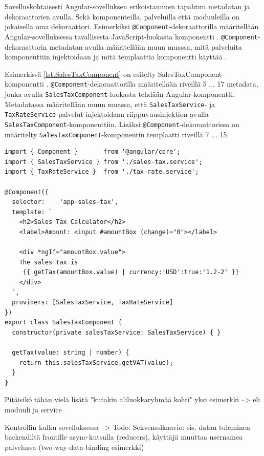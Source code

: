 \documentclass[finnish]{tktltiki2}
\theoremstyle{definition}
\theoremstyle{remark}
\numberwithin{figure}{section}
\begin{document}
Sovelluskohtaisesti Angular-sovelluksen erikoistaminen tapahtuu metadatan ja dekoraattorien avulla. Sekä komponenteilla, palveluilla että moduuleilla on jokaisella oma dekoraattori. Esimerkiksi \texttt{@Component}-dekoraattorilla määritellään Angular-sovelluksessa tavallisesta JavaScript-luokasta komponentti \cite{ArchitectureComponents}. \texttt{@Component}-dekoraattorin metadatan avulla määritellään muun muassa, mitä palveluita komponenttiin injektoidaan ja mitä templaattia komponentti käyttää \cite{ArchitectureComponents}. 

Esimerkissä \ref{lst:SalesTaxComponent} on esitelty SalesTaxComponent-komponentti \cite{ExampleApplication}. \texttt{@Component}-dekoraattorilla määritellään riveillä 5 ... 17 metadata, jonka avulla \texttt{SalesTaxComponent}-luokasta tehdään Angular-komponentti. Metadatassa määritellään muun muassa, että \texttt{SalesTaxService}- ja \texttt{TaxRateService}-palvelut injektoidaan riippuvuusinjektion avulla \texttt{SalesTaxComponent}-komponenttiin. Lisäksi \texttt{@Component}-dekoraattorissa on määritelty \texttt{SalesTaxComponent}-komponentin templaatti riveillä 7 ... 15. 

\begin{lstlisting}[style=htmlcssjs, caption=SalesTaxComponent-komponentti \protect\cite{ExampleApplication}, label=lst:SalesTaxComponent ]
import { Component }       from '@angular/core';
import { SalesTaxService } from './sales-tax.service';
import { TaxRateService }  from './tax-rate.service';

@Component({
  selector:    'app-sales-tax',
  template: `
    <h2>Sales Tax Calculator</h2>
    <label>Amount: <input #amountBox (change)="0"></label>

    <div *ngIf="amountBox.value">
    The sales tax is
     {{ getTax(amountBox.value) | currency:'USD':true:'1.2-2' }}
    </div>
  `,
  providers: [SalesTaxService, TaxRateService]
})
export class SalesTaxComponent {
  constructor(private salesTaxService: SalesTaxService) { }

  getTax(value: string | number) {
    return this.salesTaxService.getVAT(value);
  }
}
\end{lstlisting}

Pitäisikö tähän vielä lisätä "kutakin aliluokkaryhmää kohti" yksi esimerkki --> eli moduuli ja service

Kontrollin kulku sovelluksessa --> Todo: Sekvenssikaavio: sis. datan tuleminen backendiltä frontille async-kutsulla (reducers), käyttäjä muuttaa usernamea palvelussa (two-way-data-binding esimerkki)
\end{document}
